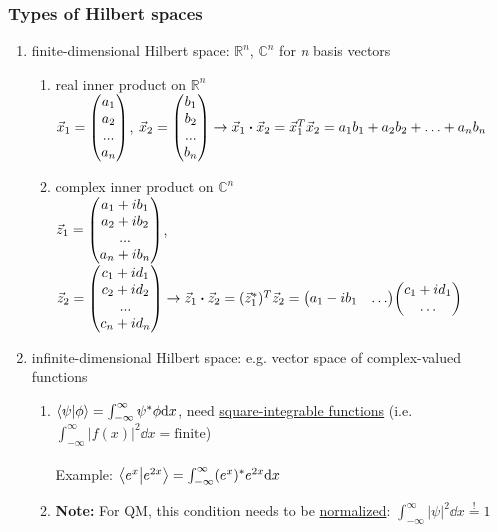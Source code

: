 \documentclass[]{article}
\begin{document}
\subsubsection{Types of Hilbert spaces}
\begin{enumerate}
    \item finite-dimensional Hilbert space: $\mathbb{R}^{n}$, $\mathbb{C}^{n}$ for \textit{n} basis vectors
    \begin{enumerate}
        \item real inner product on $\mathbb{R}^{n}$ \\ $\vec{x}_1 = \mqty(a_1 \\ a_2 \\ ... \\ a_n)$, $\vec{x}_2 = \mqty(b_1 \\ b_2 \\ ... \\ b_n) \rightarrow \vec{x}_1\vdot\vec{x}_2 = \vec{x}_1^T\vec{x}_2 = a_1 b_1 + a_2 b_2 + \ldots + a_n b_n$
        \item complex inner product on $\mathbb{C}^{n}$ \\ $\vec{z}_1 = \mqty(a_1+ib_1 \\ a_2+ib_2 \\ ... \\ a_n+ib_n)$, $\vec{z}_2 = \mqty(c_1+id_1 \\ c_2+id_2 \\ ... \\ c_n+id_n) \rightarrow \vec{z}_1\vdot\vec{z}_2 = (\vec{z}_1^*)^T \vec{z}_2 = \mqty(a_1-ib_1 & \ldots) \mqty(c_1+id_1 \\ \ldots)$
    \end{enumerate}

    \item infinite-dimensional Hilbert space: e.g. vector space of complex-valued functions
    \begin{enumerate}
        \item $\braket{\psi}{\phi} = \int_{-\infty}^{\infty} \psi^* \phi \dd x$, need \underline{square-integrable functions} (i.e. $\int_{-\infty}^{\infty}  \left|f(x)\right|^2 \dd x = \textrm{finite}$) \\ \\
        Example: $\braket{e^x}{e^{2x}} = \int_{-\infty}^{\infty} (e^x)^* e^{2x} \dd x$
        \item \textbf{Note:} For QM, this condition needs to be \underline{normalized}: $\int_{-\infty}^{\infty}  \left|\psi\right|^2 \dd x \overset{!}{=} 1$
    \end{enumerate}
\end{enumerate}
\end{document}
